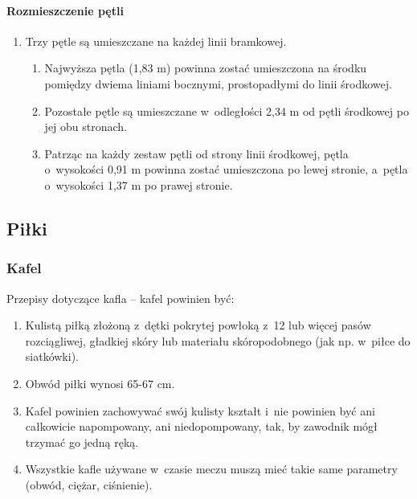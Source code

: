 \documentclass[12pt]{article}
\begin{document}
\paragraph{Rozmieszczenie pętli}
\begin{enumerate}
	\item Trzy pętle są umieszczane na każdej linii bramkowej.
	      \begin{enumerate}
		      \item Najwyższa pętla (1,83 m) powinna zostać umieszczona na środku
		            pomiędzy dwiema liniami bocznymi, prostopadłymi do linii środkowej.

		      \item Pozostałe pętle są umieszczane w~odległości 2,34 m od pętli
		            środkowej po jej obu stronach.

		      \item Patrząc na każdy zestaw pętli od strony linii środkowej, pętla o~wysokości 0,91 m powinna zostać umieszczona po lewej stronie, a~pętla o~wysokości 1,37 m po prawej stronie.
	      \end{enumerate}
\end{enumerate}

\subsection{Piłki}

\subsubsection{Kafel}
Przepisy dotyczące kafla -- kafel powinien być:

\begin{enumerate}
	\item Kulistą piłką złożoną z~dętki pokrytej powłoką z~12 lub więcej pasów
	      rozciągliwej, gładkiej skóry lub materiału skóropodobnego (jak np. w~piłce do siatkówki).

	\item Obwód piłki wynosi 65-67 cm.

	\item Kafel powinien zachowywać swój kulisty kształt i~nie powinien być ani
	      całkowicie napompowany, ani niedopompowany, tak, by zawodnik mógł
	      trzymać go jedną ręką.

	\item Wszystkie kafle używane w~czasie meczu muszą mieć takie same
	      parametry (obwód, ciężar, ciśnienie).
\end{enumerate}
\end{document}
